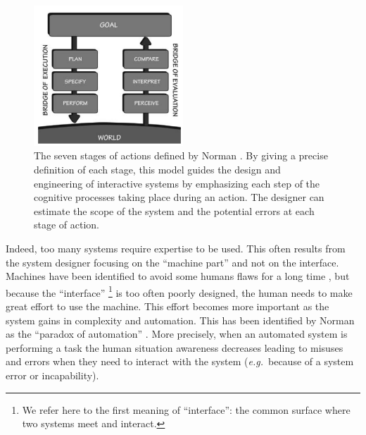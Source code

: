 \documentclass[a4paper,11pt,twoside]{StyleThese}
\begin{document}
\begin{figure}
\centering
\includegraphics[width=0.5\textwidth]{figures/chapter1/Norman_7_stages_action.png}
\caption{The seven stages of actions defined by Norman \cite{norman2013design}. By giving a precise definition of each stage, this model guides the design and engineering of interactive systems by emphasizing each step of the cognitive processes taking place during an action. The designer can estimate the scope of the system and the potential errors at each stage of action.}
\label{fig:norman_7_stages}
\end{figure}

Indeed, too many systems require expertise to be used. This often results from the system designer focusing on the ``machine part'' and not on the interface. Machines have been identified to avoid some humans flaws for a long time \cite{fitts_human_1951}, but because the ``interface'' \footnote{We refer here to the first meaning of ``interface'': the common surface where two systems meet and interact.} is too often poorly designed, the human needs to make great effort to use the machine. This effort becomes more important as the system gains in complexity and automation. This has been identified by Norman as the ``paradox of automation'' \cite{norman2013design}. More precisely, when an automated system is performing a task the human situation awareness \cite{endsley_design_1988} decreases leading to misuses and errors when they need to interact with the system (\textit{e.g.}~because of a system error or incapability).
\end{document}
